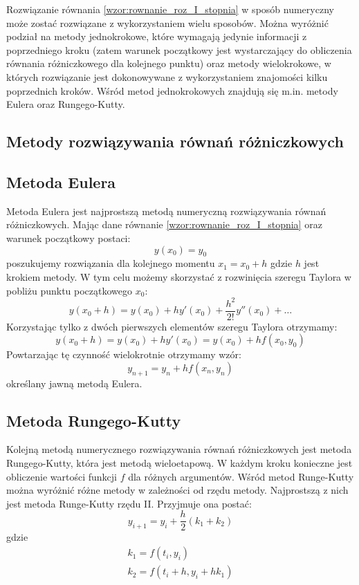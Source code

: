 Rozwiązanie równania \ref{wzor:rownanie_roz_I_stopnia} w sposób numeryczny może zostać rozwiązane z wykorzystaniem wielu sposobów. Można wyróżnić podział na metody jednokrokowe, które wymagają jedynie informacji z poprzedniego kroku (zatem warunek początkowy jest wystarczający do obliczenia równania różniczkowego dla kolejnego punktu) oraz metody wielokrokowe, w których rozwiązanie jest dokonowywane z wykorzystaniem znajomości kilku poprzednich kroków. Wśród metod jednokrokowych znajdują się m.in. metody Eulera oraz Rungego-Kutty.

\subsection{Metody rozwiązywania równań różniczkowych}

\subsection*{Metoda Eulera}
Metoda Eulera jest najprostszą metodą numeryczną rozwiązywania równań różniczkowych. Mając dane równanie \ref{wzor:rownanie_roz_I_stopnia} oraz warunek początkowy postaci:
\begin{equation}
	y(x_0) = y_0	
\end{equation}
poszukujemy rozwiązania dla kolejnego momentu $x_1 = x_0 + h$ gdzie $h$ jest krokiem metody. W tym celu możemy skorzystać z rozwinięcia szeregu Taylora w pobliżu punktu początkowego $x_0$:
\begin{equation}
	y(x_0 + h) = y(x_0) + hy'(x_0) + \frac{h^2}{2!}y''(x_0) + \hdots
\end{equation}
Korzystając tylko z dwóch pierwszych elementów szeregu Taylora otrzymamy:
\begin{equation}
	y(x_0 + h) = y(x_0) + hy'(x_0) = y(x_0) + hf(x_0,y_0)
\end{equation}
Powtarzając tę czynność wielokrotnie otrzymamy wzór:
\begin{equation}
	y_{n+1} = y_{n} + hf(x_n,y_n)
\end{equation}
określany jawną metodą Eulera.

\subsection*{Metoda Rungego-Kutty}
Kolejną metodą numerycznego rozwiązywania równań różniczkowych jest metoda Rungego-Kutty, która jest metodą wieloetapową. W każdym kroku konieczne jest obliczenie wartości funkcji $f$ dla różnych argumentów. Wśród metod Runge-Kutty można wyróżnić różne metody w zależności od rzędu metody. Najprostszą z nich jest metoda Runge-Kutty rzędu II. Przyjmuje ona postać:
\begin{equation}
	y_{i+1} = y_i + \frac{h}{2}(k_1 + k_2)
\end{equation}
gdzie
$$\begin{array}{c}
	k_1 = f(t_i,y_i) \\
	k_2 = f(t_i + h, y_i + hk_1)
\end{array}$$

